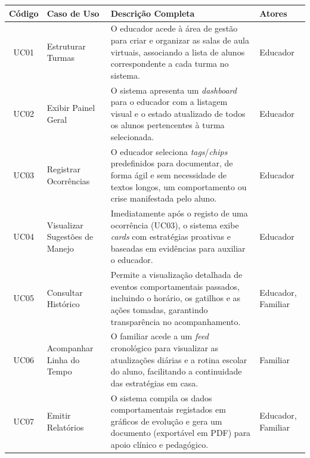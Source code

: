 \begin{quadro}[H]
    \centering
    \caption{Quadro de Casos de Uso do Sistema}
    \label{quadro:casos_uso_sistema}
    \renewcommand{\arraystretch}{1.5} %
    \small %
    
    \begin{tabular}{|c|p{3.2cm}|p{7.3cm}|p{2.5cm}|}
        \hline
        \textbf{Código} & \textbf{Caso de Uso} & \textbf{Descrição Completa} & \textbf{Atores} \\ \hline
        
        UC01 & Estruturar Turmas & O educador acede à área de gestão para criar e organizar as salas de aula virtuais, associando a lista de alunos correspondente a cada turma no sistema. & Educador \\ \hline
        
        UC02 & Exibir Painel Geral & O sistema apresenta um \textit{dashboard} para o educador com a listagem visual e o estado atualizado de todos os alunos pertencentes à turma selecionada. & Educador \\ \hline
        
        UC03 & Registrar Ocorrências & O educador seleciona \textit{tags}/\textit{chips} predefinidos para documentar, de forma ágil e sem necessidade de textos longos, um comportamento ou crise manifestada pelo aluno. & Educador \\ \hline
        
        UC04 & Visualizar Sugestões de Manejo & Imediatamente após o registo de uma ocorrência (UC03), o sistema exibe \textit{cards} com estratégias proativas e baseadas em evidências para auxiliar o educador. & Educador \\ \hline
        
        UC05 & Consultar Histórico & Permite a visualização detalhada de eventos comportamentais passados, incluindo o horário, os gatilhos e as ações tomadas, garantindo transparência no acompanhamento. & Educador, Familiar \\ \hline
        
        UC06 & Acompanhar Linha do Tempo & O familiar acede a um \textit{feed} cronológico para visualizar as atualizações diárias e a rotina escolar do aluno, facilitando a continuidade das estratégias em casa. & Familiar \\ \hline
        
        UC07 & Emitir Relatórios & O sistema compila os dados comportamentais registados em gráficos de evolução e gera um documento (exportável em PDF) para apoio clínico e pedagógico. & Educador, Familiar \\ \hline


\end{tabular}
\end{quadro}
